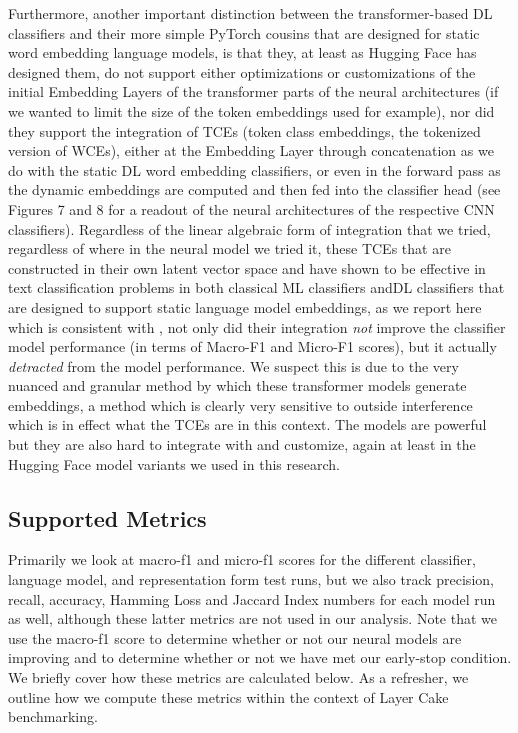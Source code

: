 \documentclass[final]{clv2025}
\begin{document}
Furthermore, another important distinction between the transformer-based DL classifiers and their more simple PyTorch cousins that are designed for static word embedding language models, is that they, at least as Hugging Face has designed them, do not support either optimizations or customizations of the initial Embedding Layers of the transformer parts of the neural architectures (if we wanted to limit the size of the token embeddings used for example), nor did they support the integration of TCEs (token class embeddings, the tokenized version of WCEs), either at the Embedding Layer through concatenation as we do with the static DL word embedding classifiers, or even in the forward pass as the dynamic embeddings are computed and then fed into the classifier head (see Figures 7 and 8 for a readout of the neural architectures of the respective CNN classifiers). Regardless of the linear algebraic form of integration that we tried, regardless of where in the neural model we tried it, these TCEs that are constructed in their own latent vector space and have shown to be effective in text classification problems in both classical ML classifiers andDL classifiers that are designed to support static language model embeddings, as we report here which is consistent with \cite{moreo2021}, not only did their integration \textit{not} improve the classifier model performance (in terms of Macro-F1 and Micro-F1 scores), but it actually \textit{detracted} from the model performance. We suspect this is due to the very nuanced and granular method by which these transformer models generate embeddings, a method which is clearly very sensitive to outside interference which is in effect what the TCEs are in this context. The models are powerful but they are also hard to integrate with and customize, again at least in the Hugging Face model variants we used in this research.


\subsection{Supported Metrics}
Primarily we look at macro-f1 and micro-f1 scores for the different classifier, language model, and representation form test runs, but we also track precision, recall, accuracy, Hamming Loss and Jaccard Index numbers for each model run as well, although these latter metrics are not used in our analysis. Note that we use the macro-f1 score to determine whether or not our neural models are improving and to determine whether or not we have met our early-stop condition. We briefly cover how these metrics are calculated below. As a refresher, we outline how we compute these metrics within the context of Layer Cake benchmarking. 
\end{document}
